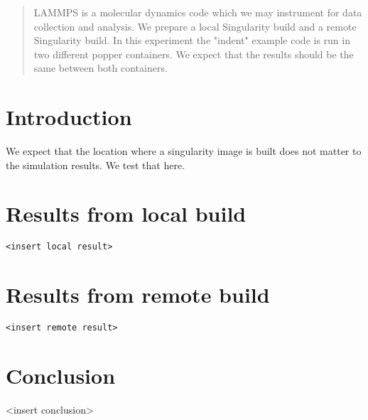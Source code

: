\documentclass[12pt]{article}
\begin{document}
\maketitle

\begin{abstract}
	LAMMPS is a molecular dynamics code which we may instrument for data collection and analysis. We prepare a local Singularity build and a remote Singularity build. In this experiment the "indent" example code is run in two different popper containers. We expect that the results should be the same between both containers.
\end{abstract}
\section*{Introduction}
We expect that the location where a singularity image is built does not matter to the simulation results. We test that here.
\section*{Results from local build}
\begin{verbatim}
<insert local result>
\end{verbatim}
\section*{Results from remote build}
\begin{verbatim}
<insert remote result>
\end{verbatim}
\section*{Conclusion}
<insert conclusion>
\end{document}
